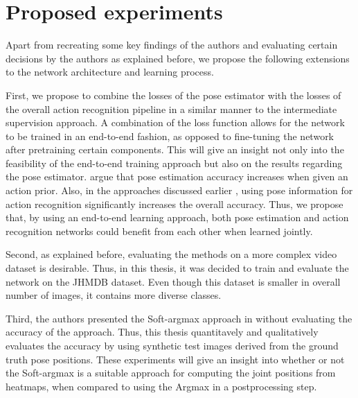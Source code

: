 \section{Proposed experiments}
Apart from recreating some key findings of the authors and evaluating certain decisions by the authors as explained before, we propose the following extensions to the network architecture and learning process.

First, we propose to combine the losses of the pose estimator with the losses of the overall action recognition pipeline in a similar manner to the intermediate supervision approach.
A combination of the loss function allows for the network to be trained in an end-to-end fashion, as opposed to fine-tuning the network after pretraining certain components.
This will give an insight not only into the feasibility of the end-to-end training approach but also on the results regarding the pose estimator.
\cite{iqbal_pose_2016} argue that pose estimation accuracy increases when given an action prior.
Also, in the approaches discussed earlier , using pose information for action recognition significantly increases the overall accuracy.
Thus, we propose that, by using an end-to-end learning approach, both pose estimation and action recognition networks could benefit from each other when learned jointly.

Second, as explained before, evaluating the methods on a more complex video dataset is desirable.
Thus, in this thesis, it was decided to train and evaluate the network on the JHMDB dataset.
Even though this dataset is smaller in overall number of images, it contains more diverse classes.

Third, the authors presented the Soft-argmax approach in \cite{luvizon_human_2017} without evaluating the accuracy of the approach.
Thus, this thesis quantitavely and qualitatively evaluates the accuracy by using synthetic test images derived from the ground truth pose positions.
These experiments will give an insight into whether or not the Soft-argmax is a suitable approach for computing the joint positions from heatmaps, when compared to using the Argmax in a postprocessing step.

